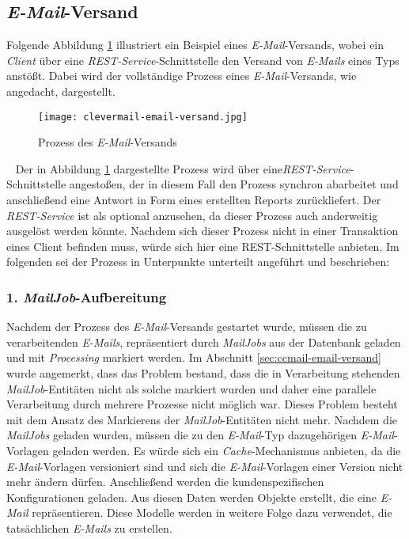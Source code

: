 \newpage
\subsection{\emph{E-Mail}-Versand}
Folgende Abbildung \ref{fig:clevermail-email-versand} illustriert ein Beispiel eines \emph{E-Mail}-Versands, wobei ein \emph{Client} über eine \emph{REST-Service}-Schnittstelle den Versand von \emph{E-Mails} eines Typs anstößt. Dabei wird der vollständige Prozess eines \emph{E-Mail}-Versands, wie angedacht, dargestellt.
\begin{figure}[H]
\centering
\texttt{[image: clevermail-email-versand.jpg]} %
\caption{Prozess des \emph{E-Mail}-Versands}
\label{fig:clevermail-email-versand}
\end{figure}
\ \newline
Der in Abbildung \ref{fig:clevermail-email-versand} dargestellte Prozess wird über eine\emph{REST-Service}-Schnittstelle angestoßen, der in diesem Fall den Prozess synchron abarbeitet und anschließend eine Antwort in Form eines erstellten Reports zurückliefert. Der \emph{REST-Service} ist als optional anzusehen, da dieser Prozess auch anderweitig ausgelöst werden könnte. Nachdem sich dieser Prozess nicht in einer Transaktion eines Client befinden muss, würde sich hier eine REST-Schnittstelle anbieten.
\newline
\newline
Im folgenden sei der Prozess in Unterpunkte unterteilt angeführt und beschrieben:

\subsubsection{1. \emph{MailJob}-Aufbereitung}
Nachdem der Prozess des \emph{E-Mail}-Versands gestartet wurde, müssen die zu verarbeitenden \emph{E-Mails}, repräsentiert durch \emph{MailJobs} aus der Datenbank geladen und mit \emph{Processing} markiert werden. Im Abschnitt \ref{sec:ccmail-email-versand} wurde angemerkt, dass das Problem bestand, dass die in Verarbeitung stehenden \emph{MailJob}-Entitäten nicht als solche markiert wurden und daher eine parallele Verarbeitung durch mehrere Prozesse nicht möglich war. Dieses Problem besteht mit dem Ansatz des Markierens der \emph{MailJob}-Entitäten nicht mehr. Nachdem die \emph{MailJobs} geladen wurden, müssen die zu den \emph{E-Mail}-Typ dazugehörigen \emph{E-Mail}-Vorlagen geladen werden. Es würde sich ein \emph{Cache}-Mechanismus anbieten, da die \emph{E-Mail}-Vorlagen versioniert sind und sich die \emph{E-Mail}-Vorlagen einer Version nicht mehr ändern dürfen. Anschließend werden die kundenspezifischen Konfigurationen geladen. Aus diesen Daten werden Objekte erstellt, die eine \emph{E-Mail} repräsentieren. Diese Modelle werden in weitere Folge dazu verwendet, die tatsächlichen \emph{E-Mails} zu erstellen.

